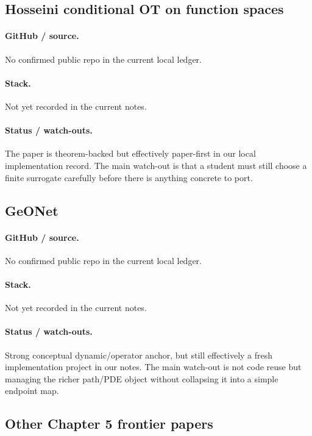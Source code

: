 \documentclass[11pt]{report}
\begin{document}
\subsection*{Hosseini conditional OT on function spaces}
\paragraph{GitHub / source.}
No confirmed public repo in the current local ledger.

\paragraph{Stack.}
Not yet recorded in the current notes.

\paragraph{Status / watch-outs.}
The paper is theorem-backed but effectively paper-first in our local
implementation record.  The main watch-out is that a student must still choose a
finite surrogate carefully before there is anything concrete to port.

\subsection*{GeONet}
\paragraph{GitHub / source.}
No confirmed public repo in the current local ledger.

\paragraph{Stack.}
Not yet recorded in the current notes.

\paragraph{Status / watch-outs.}
Strong conceptual dynamic/operator anchor, but still effectively a fresh
implementation project in our notes.  The main watch-out is not code reuse but
managing the richer path/PDE object without collapsing it into a simple endpoint
map.

\subsection*{Other Chapter 5 frontier papers}
\end{document}
